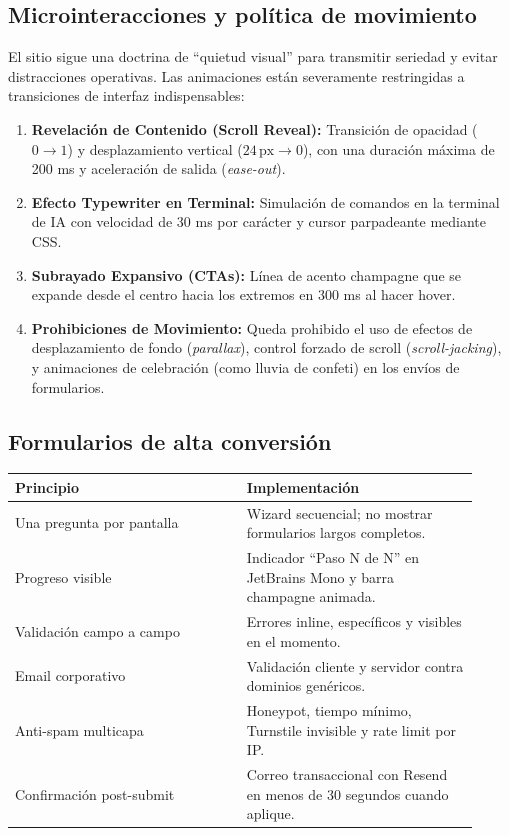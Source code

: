 \documentclass[11pt,letterpaper]{article}
\begin{document}
\subsection{Microinteracciones y política de movimiento}
El sitio sigue una doctrina de ``quietud visual'' para transmitir seriedad y evitar distracciones operativas. Las animaciones están severamente restringidas a transiciones de interfaz indispensables:
\begin{enumerate}
\item \textbf{Revelación de Contenido (Scroll Reveal):} Transición de opacidad ($0 \to 1$) y desplazamiento vertical ($24\,\text{px} \to 0$), con una duración máxima de 200 ms y aceleración de salida (\emph{ease-out}).
\item \textbf{Efecto Typewriter en Terminal:} Simulación de comandos en la terminal de IA con velocidad de 30 ms por carácter y cursor parpadeante mediante CSS.
\item \textbf{Subrayado Expansivo (CTAs):} Línea de acento champagne que se expande desde el centro hacia los extremos en 300 ms al hacer hover.
\item \textbf{Prohibiciones de Movimiento:} Queda prohibido el uso de efectos de desplazamiento de fondo (\emph{parallax}), control forzado de scroll (\emph{scroll-jacking}), y animaciones de celebración (como lluvia de confeti) en los envíos de formularios.
\end{enumerate}

\subsection{Formularios de alta conversión}

\begin{longtable}{p{0.46\linewidth}p{0.46\linewidth}}
\toprule
\textbf{Principio} & \textbf{Implementación} \\
\midrule
Una pregunta por pantalla & Wizard secuencial; no mostrar formularios largos completos. \\
Progreso visible & Indicador “Paso N de N” en JetBrains Mono y barra champagne animada. \\
Validación campo a campo & Errores inline, específicos y visibles en el momento. \\
Email corporativo & Validación cliente y servidor contra dominios genéricos. \\
Anti-spam multicapa & Honeypot, tiempo mínimo, Turnstile invisible y rate limit por IP. \\
Confirmación post-submit & Correo transaccional con Resend en menos de 30 segundos cuando aplique. \\
\bottomrule
\end{longtable}
\end{document}
